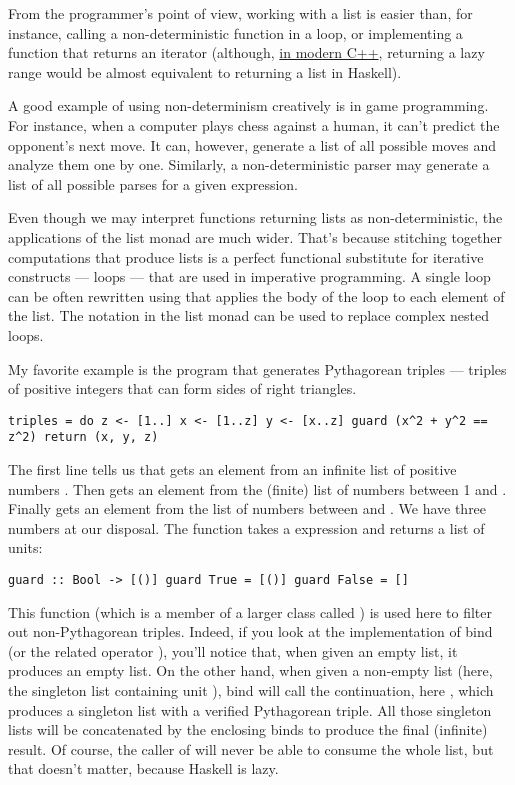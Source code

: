 From the programmer's point of view, working with a list is easier than,
for instance, calling a non-deterministic function in a loop, or
implementing a function that returns an iterator (although,
\href{http://ericniebler.com/2014/04/27/range-comprehensions/}{in modern
C++}, returning a lazy range would be almost equivalent to returning a
list in Haskell).

A good example of using non-determinism creatively is in game
programming. For instance, when a computer plays chess against a human,
it can't predict the opponent's next move. It can, however, generate a
list of all possible moves and analyze them one by one. Similarly, a
non-deterministic parser may generate a list of all possible parses for
a given expression.

Even though we may interpret functions returning lists as
non-deterministic, the applications of the list monad are much wider.
That's because stitching together computations that produce lists is a
perfect functional substitute for iterative constructs --- loops ---
that are used in imperative programming. A single loop can be often
rewritten using  that applies the body of the loop to each
element of the list. The  notation in the list monad can be
used to replace complex nested loops.

My favorite example is the program that generates Pythagorean triples
--- triples of positive integers that can form sides of right triangles.

\begin{verbatim}
triples = do z <- [1..] x <- [1..z] y <- [x..z] guard (x^2 + y^2 == z^2) return (x, y, z)
\end{verbatim}

The first line tells us that  gets an element from an infinite
list of positive numbers \code{{[}1..{]}}. Then  gets an
element from the (finite) list \code{{[}1..z{]}} of numbers between 1
and . Finally  gets an element from the list of
numbers between  and . We have three numbers
 at our
disposal. The function  takes a  expression
and returns a list of units:

\begin{verbatim}
guard :: Bool -> [()] guard True = [()] guard False = []
\end{verbatim}

This function (which is a member of a larger class called
) is used here to filter out non-Pythagorean triples.
Indeed, if you look at the implementation of bind (or the related
operator \code{\textgreater{}\textgreater{}}), you'll notice that,
when given an empty list, it produces an empty list. On the other hand,
when given a non-empty list (here, the singleton list containing unit
\code{{[}(){]}}), bind will call the continuation, here
, which produces a singleton list with a
verified Pythagorean triple. All those singleton lists will be
concatenated by the enclosing binds to produce the final (infinite)
result. Of course, the caller of  will never be able to
consume the whole list, but that doesn't matter, because Haskell is
lazy.

